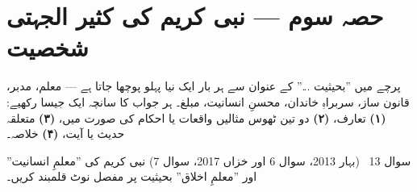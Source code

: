 %

\section*{حصہ سوم --- نبی کریم \saw کی کثیر الجہتی شخصیت}

\begin{nukta}
پرچے میں ''بحیثیت ...'' کے عنوان سے ہر بار ایک نیا پہلو پوچھا جاتا ہے ---
معلم، مدبر، قانون ساز، سربراہِ خاندان، محسنِ انسانیت، مبلغ۔ ہر جواب کا
سانچہ ایک جیسا رکھیے: \textbf{(۱)} تعارف، \textbf{(۲)} دو تین ٹھوس مثالیں
واقعات یا احکام کی صورت میں، \textbf{(۳)} متعلقہ حدیث یا آیت، \textbf{(۴)}
خلاصہ۔
\end{nukta}

\begin{sawal}{سوال \textenglish{13} \ \textnormal{\small(بہار \textenglish{2013}، سوال \textenglish{6} اور خزاں \textenglish{2017}، سوال \textenglish{7})}}
نبی کریم \saw کی ''معلمِ انسانیت'' اور ''معلمِ اخلاق'' بحیثیت پر مفصل نوٹ
قلمبند کریں۔
\end{sawal}

